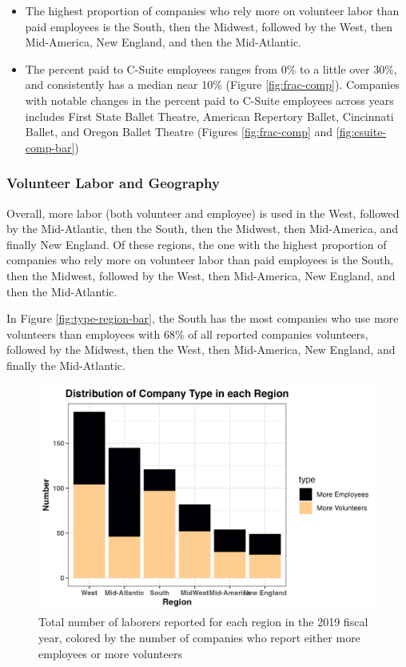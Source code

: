 \documentclass[Dance Data
Project,article,submit,moreauthors,pdftex]{mdpi}
\providecommand{\tightlist}{%
  \setlength{\itemsep}{0pt}\setlength{\parskip}{0pt}}
\begin{document}
\begin{itemize}
\tightlist
\item
  The highest proportion of companies who rely more on volunteer labor
  than paid employees is the South, then the Midwest, followed by the
  West, then Mid-America, New England, and then the Mid-Atlantic.\\
\item
  The percent paid to C-Suite employees ranges from 0\% to a little over
  30\%, and consistently has a median near 10\% (Figure
  \ref{fig:frac-comp}). Companies with notable changes in the percent
  paid to C-Suite employees across years includes First State Ballet
  Theatre, American Repertory Ballet, Cincinnati Ballet, and Oregon
  Ballet Theatre (Figures \ref{fig:frac-comp} and
  \ref{fig:csuite-comp-bar})
\end{itemize}

\hypertarget{volunteer-labor-and-geography}{%
\subsubsection{Volunteer Labor and
Geography}\label{volunteer-labor-and-geography}}

Overall, more labor (both volunteer and employee) is used in the West,
followed by the Mid-Atlantic, then the South, then the Midwest, then
Mid-America, and finally New England. Of these regions, the one with the
highest proportion of companies who rely more on volunteer labor than
paid employees is the South, then the Midwest, followed by the West,
then Mid-America, New England, and then the Mid-Atlantic.

In Figure \ref{fig:type-region-bar}, the South has the most companies
who use more volunteers than employees with 68\% of all reported
companies volunteers, followed by the Midwest, then the West, then
Mid-America, New England, and finally the Mid-Atlantic.

\begin{figure}[H]
\includegraphics[width=0.9\linewidth,]{../images/type_region_bar} \caption{\label{fig:type-region-bar}Total number of laborers reported for each region in the 2019 fiscal year, colored by the number of companies who report either more employees or more volunteers}\label{fig:unnamed-chunk-14}
\end{figure}
\end{document}
